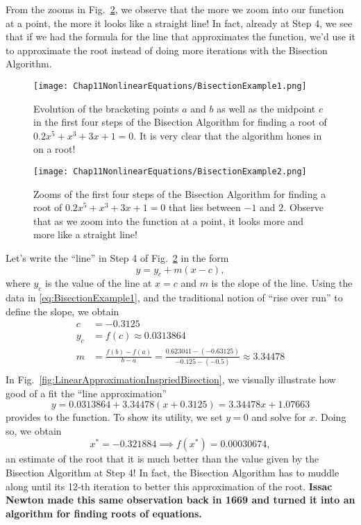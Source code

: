 
  \Qed
 
From the zooms in Fig.~\ref{fig:BisectionExample1c},  we observe that the more we zoom into our function at a point, the more it looks like a straight line!  In fact, already at Step 4, we see that if we had the formula for the line that approximates the function, we'd use it to approximate the root instead of doing more iterations with the Bisection Algorithm. \\
  
    \begin{figure}[h!]
    \centering
    \texttt{[image: Chap11NonlinearEquations/BisectionExample1.png]}
    \caption[]{Evolution of the bracketing points $a$ and $b$ as well as the midpoint $c$ in the first four steps of the Bisection Algorithm for finding a root of $0.2x^5  + x^3 + 3x + 1=0$. It is very clear that the algorithm hones in on a root!
    } 
    \label{fig:BisectionExample1b}
    \end{figure}
    
    
     \begin{figure}[h!]
    \centering
    \texttt{[image: Chap11NonlinearEquations/BisectionExample2.png]}
    \caption[]{Zooms of the first four steps of the Bisection Algorithm for finding a root of $0.2x^5  + x^3 + 3x + 1=0$ that lies between $-1$ and $2$. Observe that as we zoom into the function at a point, it looks more and more like a straight line! 
    }
    \label{fig:BisectionExample1c}
    \end{figure}


\begin{tcolorbox}[sharp corners, colback=green!30, colframe=green!80!blue, title=\textbf{\large Linear Approximations of Functions can be Very Useful}]
Let's write the ``line'' in Step 4 of Fig.~\ref{fig:BisectionExample1c} in the form
$$y = y_c + m(x-c),$$
where $ y_c$ is the value of the line at $x=c$ and $m$ is the slope of the line. Using the data in \eqref{eq:BisectionExample1}, and the traditional notion of ``rise over run'' to define the slope, we obtain
\begin{align*}
        c&=-0.3125 \\
    y_c&=f(c)\approx 0.0313864 \\
        m&=\frac{f(b)-f(a)}{b-a}= \frac{0.623041 - (-0.63125)}{-0.125 - (-0.5 )}\approx 3.34478\\
\end{align*}
In Fig.~\ref{fig:LinearApproximationInspriedBisection}, we visually illustrate how good of a fit the ``line approximation'' 
$$y=0.0313864 + 3.34478(x+0.3125)=3.34478 x + 1.07663 $$
provides to the function. To show its utility,  
we set $y=0$ and solve for $x$. Doing so, we obtain
$$\boxed{ x^\ast = -0.321884\implies f(x^\ast)=0.00030674,}$$ 
an estimate of the root that it is much better than the value given by the Bisection Algorithm at Step 4! In fact, the Bisection Algorithm has to muddle along until its 12-th iteration to better this approximation of the root. \textbf{Issac Newton made this same observation back in 1669 and turned it into an algorithm for finding roots of equations.} 
\end{tcolorbox}



